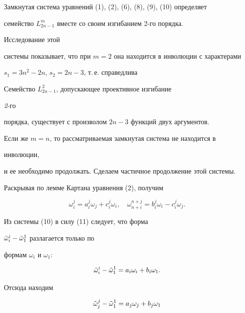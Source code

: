 Замкнутая система уравнений (1), (2), (6), (8), (9), (10) определяет 


семейство $L^m_{2n-1}$ вместе со своим изгибанием 2-го порядка. 


Исследование этой 


системы показывает, что при $m=2$ она находится в инволюции с характерами 


$s_1=3n^2-2n$, $s_2=2n-3$, т.\,е. справедлива 


 


\begin{thm} Семейство $L^2_{2n-1}$, допускающее проективное изгибание 


{\em 2}-го 


порядка, существует с произволом $2n-3$ функций двух аргументов. 


\end{thm} 


 


Если же $m=n$, то рассматриваемая замкнутая система не находится в 


инволюции, 


и ее необходимо продолжать. Сделаем частичное продолжение этой системы. 


 


Раскрывая по лемме Картана уравнения (2), получим 


\begin{equation} 


\omega^j_i=a^j_i\omega_j+c^j_i\omega_i,\quad 


\omega^{n+j}_{n+i}=b^j_i\omega_i-c^j_i\omega_j. 


\end{equation} 


Из системы (10) в силу (11) следует, что форма 


$\Tilde\omega^i_i-\Tilde\omega^1_1$ разлагается только по 


формам $\omega_i$ и $\omega_1$: 


$$ 


\Tilde \omega^i_i-\Tilde\omega^1_1=a_i\omega_i+b_i\omega_1. 


$$ 


Отсюда находим


$$ 


\Tilde\omega^j_j-\Tilde\omega^1_1=a_j\omega_j+b_j\omega_1 


$$ 


